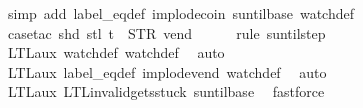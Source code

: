 \begin{isabellebody}
{\ {\isacharparenleft}simp\ add{\isacharcolon}\ label_eq{\isacharunderscore}def\ implode{\isacharunderscore}coin\ suntil{\isachardot}base\ watch{\isacharunderscore}def{\isacharparenright}\isanewline
\ \ \isamarkupfalse%
\ {\isacharparenleft}case{\isacharunderscore}tac\ {\isachardoublequoteopen}shd\ {\isacharparenleft}stl\ t{\isacharparenright}\ {\isacharequal}\ {\isacharparenleft}STR\ {\isacharprime}{\isacharprime}vend{\isacharprime}{\isacharprime}{\isacharcomma}\ {\isacharbrackleft}{\isacharbrackright}{\isacharparenright}{\isachardoublequoteclose}{\isacharparenright}\isanewline
\ \ \ \isamarkupfalse%
\ {\isacharparenleft}rule\ suntil{\isachardot}step{\isacharparenright}\isanewline
\ \ \isamarkupfalse%
\ LTL{\isacharunderscore}aux{}\ watch{\isacharunderscore}def\ watch{\isacharunderscore}def\ \isamarkupfalse%
\ auto{\isacharbrackleft}{}{\isacharbrackright}\isanewline
\ \ \isamarkupfalse%
\ LTL{\isacharunderscore}aux{}\ label_eq{\isacharunderscore}def\ implode{\isacharunderscore}vend\ watch{\isacharunderscore}def\ \isamarkupfalse%
\ auto{\isacharbrackleft}{}{\isacharbrackright}\isanewline
\ \ \isamarkupfalse%
\ LTL{\isacharunderscore}aux{}\ LTL{\isacharunderscore}invalid{\isacharunderscore}gets{\isacharunderscore}stuck{\isacharunderscore}{}\ suntil{\isachardot}base\ \isamarkupfalse%
\ fastforce%
\endisatagproof
{\isafoldproof}%
%
\isadelimproof
%
\endisadelimproof
%
}%
%
\isadelimtheory
%
\endisadelimtheory
%
\isatagtheory
{}\isamarkupfalse%
%
\endisatagtheory
{\isafoldtheory}%
%
\isadelimtheory
%
\endisadelimtheory
%
\end{isabellebody}%
\endinput

